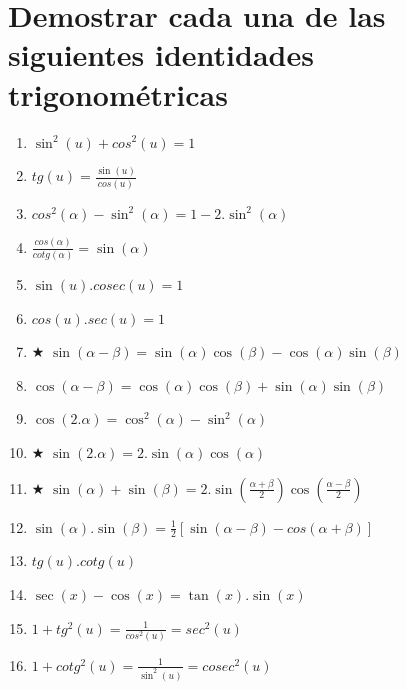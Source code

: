 \documentclass[a4paper,11pt,spanish,sans]{exam}
\begin{document}
\section{Demostrar cada una de las siguientes identidades trigonométricas}
\label{demostraciones}

\begin{multicols}{2}%
\begin{enumerate}
	
	\item  $ \sin^2(u)+cos^2(u)=1 $
	
	\item  $ tg(u)=\frac{\sin(u)}{cos(u)} $
	
	\item $cos^2(\alpha)-\sin^2(\alpha)=1-2.\sin^2(\alpha)$
	
	\item $\frac{cos(\alpha)}{cotg(\alpha)}=\sin(\alpha)$
	
	\item  $ \sin(u).cosec(u)=1 $
	
	\item  $ cos(u).sec(u)=1 $
	
	\item $\bigstar$ $\sin(\alpha-\beta)=\sin(\alpha)\cos(\beta) - \cos(\alpha)\sin(\beta)$
	
\columnbreak 
	 
	\item $\cos(\alpha-\beta)=\cos(\alpha)\cos(\beta) + \sin(\alpha)\sin(\beta)$
	
	\item $\cos(2.\alpha)=\cos^2(\alpha) - \sin^2(\alpha)$
	
	\item $\bigstar$ $\sin(2.\alpha)=2.\sin(\alpha)\cos(\alpha)$

	\item $\bigstar$ $\sin(\alpha)+\sin(\beta)=2.\sin(\frac{\alpha+\beta}{2})\cos(\frac{\alpha-\beta}{2})$
	
	\item $\sin(\alpha).\sin(\beta)=\frac{1}{2}[\sin(\alpha-\beta)-cos(\alpha+\beta)]$
	
	\item  $ tg(u).cotg(u) $
	
	\item $\sec(x)-\cos(x)=\tan(x).\sin(x)$
	
	\item  $ 1+tg^2(u)=\frac{1}{cos^2(u)}=sec^2(u) $
	
	\item  $ 1+cotg^2(u)=\frac{1}{\sin^2(u)}=cosec^2(u) $

\end{enumerate}
\end{multicols}
\end{document}
